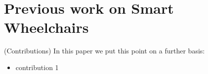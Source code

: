 

\section{Previous work on Smart Wheelchairs}

(Contributions) In this paper we put this point on a further basis:
\begin{itemize}
\item contribution 1
\end{itemize}

\endinput
Any text after an \endinput is ignored.

% 
% 
\paragraph{What is this?} A collection of research ideas.

\paragraph{Who's it for?} Me.
